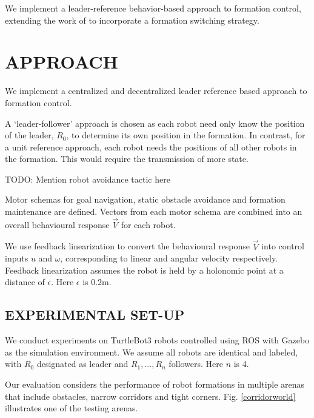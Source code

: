 \documentclass[letterpaper, 10 pt, conference]{ieeeconf}  %
\begin{document}
	We implement a leader-reference behavior-based approach to formation control, extending the work of \cite{c2} to incorporate a formation switching strategy.
	
	\section{APPROACH}
	We implement a centralized and decentralized leader reference based approach to formation control. 
	
	A `leader-follower' approach is chosen as each robot need only know the position of the leader, $R_0$, to determine its own position in the formation. In contrast, for a unit reference approach, each robot needs the positions of all other robots in the formation. This would require the transmission of more state.
	
	TODO: Mention robot avoidance tactic here
	
	Motor schemas for goal navigation, static obstacle avoidance and formation maintenance are defined. Vectors from each motor schema are combined into an overall behavioural response $\vec{V}$ for each robot.
	
	We use feedback linearization to convert the behavioural response $\vec{V}$ into control inputs $u$ and $\omega$, corresponding to linear and angular velocity respectively. Feedback linearization assumes the robot is held by a holonomic point at a distance of $\epsilon$. Here $\epsilon$ is 0.2m.
	
	\subsection{EXPERIMENTAL SET-UP}
	We conduct experiments on TurtleBot3 \cite{turtlebot} robots controlled using ROS \cite{ros} with Gazebo \cite{gazebo} as the simulation environment. We assume all robots are identical and labeled, with $R_0$ designated as leader and $R_1,...,R_n$ followers. Here $n$ is 4.
	
	Our evaluation considers the performance of robot formations in multiple arenas that include obstacles, narrow corridors and tight corners. Fig. \ref{corridorworld} illustrates one of the testing arenas.
	
\end{document}
